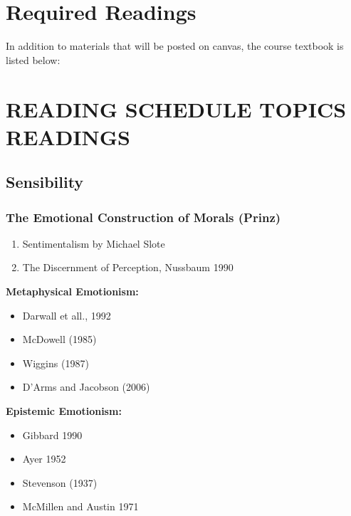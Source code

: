 \documentclass[11pt,]{article}
\providecommand{\tightlist}{%
  \setlength{\itemsep}{0pt}\setlength{\parskip}{0pt}}
\begin{document}
\section{Required Readings}\label{required-readings}

In addition to materials that will be posted on canvas, the course
textbook is listed below:

\section{READING SCHEDULE TOPICS
READINGS}\label{reading-schedule-topics-readings}

\subsection{Sensibility}\label{sensibility}

\subsubsection{The Emotional Construction of Morals
(Prinz)}\label{the-emotional-construction-of-morals-prinz}

\begin{enumerate}
\def\labelenumi{\arabic{enumi}.}
\tightlist
\item
  Sentimentalism by Michael Slote
\item
  The Discernment of Perception, Nussbaum 1990
\end{enumerate}

\textbf{Metaphysical Emotionism:}

\begin{itemize}
\tightlist
\item
  Darwall et all., 1992
\item
  McDowell (1985)
\item
  Wiggins (1987)
\item
  D'Arms and Jacobson (2006)
\end{itemize}

\textbf{Epistemic Emotionism:}

\begin{itemize}
\tightlist
\item
  Gibbard 1990
\item
  Ayer 1952
\item
  Stevenson (1937)
\item
  McMillen and Austin 1971
\end{itemize}
\end{document}
